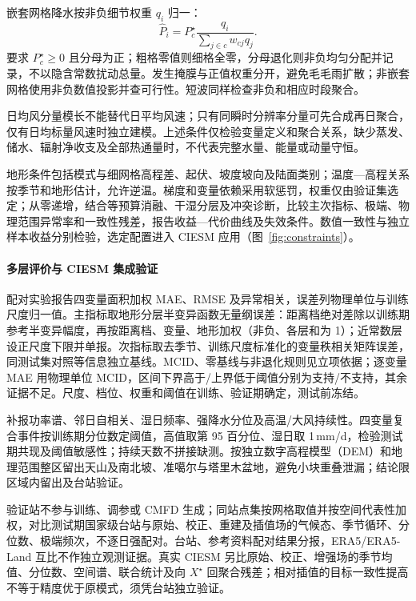 嵌套网格降水按非负细节权重 $q_i$ 归一：
\begin{equation}
\widehat{P}_i=P_c^{\star}\frac{q_i}{\sum_{j\in c}w_{cj}q_j}.
\end{equation}
要求 $P_c^{\star}\geq0$ 且分母为正；粗格零值则细格全零，分母退化则非负均匀分配并记录，不以隐含常数扰动总量。发生掩膜与正值权重分开，避免毛毛雨扩散；非嵌套网格使用非负数值投影并查可行性。短波同样检查非负和相应时段聚合。

日均风分量模长不能替代日平均风速；只有同瞬时分辨率分量可先合成再日聚合，仅有日均标量风速时独立建模。上述条件仅检验变量定义和聚合关系，缺少蒸发、储水、辐射净收支及全部热通量时，不代表完整水量、能量或动量守恒。

地形条件包括模式与细网格高程差、起伏、坡度坡向及陆面类别；温度—高程关系按季节和地形估计，允许逆温。梯度和变量依赖采用软惩罚，权重仅由验证集选定；从零递增，结合等预算消融、干湿分层及冲突诊断，比较主次指标、极端、物理范围异常率和一致性残差，报告收益—代价曲线及失效条件。数值一致性与独立样本收益分别检验，选定配置进入 CIESM 应用（图~\ref{fig:constraints}）。

\paragraph{多层评价与 CIESM 集成验证}
配对实验报告四变量面积加权 MAE、RMSE 及异常相关，误差列物理单位与训练尺度归一值。主指标取地形分层半变异函数无量纲误差：距离档绝对差除以训练期参考半变异幅度，再按距离档、变量、地形加权（非负、各层和为 1）；近常数层设正尺度下限并单报。次指标取去季节、训练尺度标准化的变量秩相关矩阵误差，同测试集对照等信息独立基线。MCID、零基线与非退化规则见立项依据；逐变量 MAE 用物理单位 MCID，区间下界高于/上界低于阈值分别为支持/不支持，其余证据不足。尺度、档位、权重和阈值在训练、验证期确定，测试前冻结。

补报功率谱、邻日自相关、湿日频率、强降水分位及高温/大风持续性。四变量复合事件按训练期分位数定阈值，高值取第 95 百分位、湿日取 1\,mm/d，检验测试期共现及阈值敏感性；持续天数不拼接缺测。按独立数字高程模型（DEM）和地理范围整区留出天山及南北坡、准噶尔与塔里木盆地，避免小块重叠泄漏；结论限区域内留出及台站验证。

验证站不参与训练、调参或 CMFD 生成；同站点集按网格取值并按空间代表性加权，对比测试期国家级台站与原始、校正、重建及插值场的气候态、季节循环、分位数、极端频次，不逐日强配对。台站、参考资料配对结果分报，ERA5/ERA5-Land 互比不作独立观测证据。真实 CIESM 另比原始、校正、增强场的季节均值、分位数、空间谱、联合统计及向 $X^{\star}$ 回聚合残差；相对插值的目标一致性提高不等于精度优于原模式，须凭台站独立验证。

